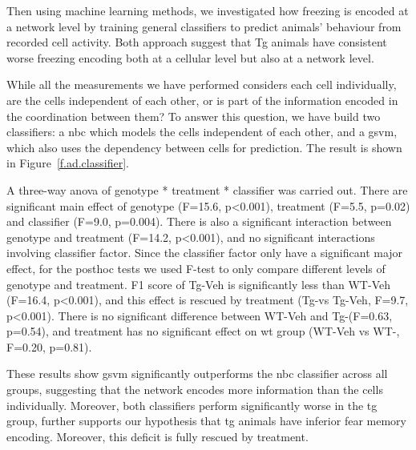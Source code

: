 Then using machine learning methods, we investigated how freezing is encoded at a network level by training general classifiers to predict animals' behaviour from recorded cell activity. Both approach suggest that Tg animals have consistent worse freezing encoding both at a cellular level but also at a network level. 

While all the measurements we have performed considers each cell individually, are the cells independent of each other, or is part of the information encoded in the coordination between them? To answer this question, we have build two classifiers: a \gls{nbc} which models the cells independent of each other, and a \gls{gsvm}, which also uses the dependency between cells for prediction. The result is shown in Figure~\ref{f.ad.classifier}. 

A three-way \gls{anova} of genotype * treatment * classifier was carried out. There are significant main effect of genotype (F=15.6, p<0.001), treatment (F=5.5, p=0.02) and classifier (F=9.0, p=0.004). There is also a significant interaction between genotype and treatment (F=14.2, p<0.001), and no significant interactions involving classifier factor. Since the classifier factor only have a significant major effect, for the posthoc tests we used F-test to only compare different levels of genotype and treatment. F1 score of Tg-Veh is significantly less than WT-Veh (F=16.4, p<0.001), and this effect is rescued by \tglu treatment (Tg-\tglu vs Tg-Veh, F=9.7, p<0.001). There is no significant difference between WT-Veh and Tg-\tglu (F=0.63, p=0.54), and \tglu treatment has no significant effect on \gls{wt} group (WT-Veh vs WT-\tglu, F=0.20, p=0.81).  

These results show \gls{gsvm} significantly outperforms the \gls{nbc} classifier across all groups, suggesting that the network encodes more information than the cells individually. Moreover, both classifiers perform significantly worse in the \gls{tg} group, further supports our hypothesis that \gls{tg} animals have inferior fear memory encoding. Moreover, this deficit is fully rescued by \tglu treatment.


